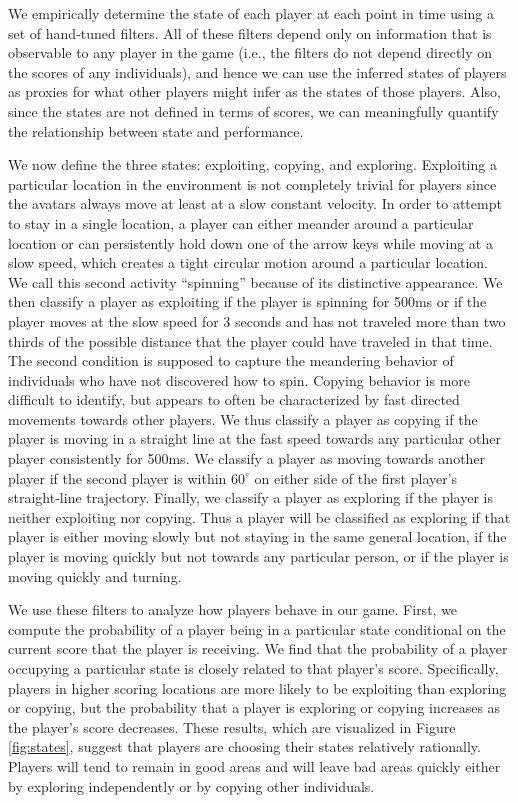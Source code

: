 \documentclass[12pt,letterpaper]{article}
\begin{document}
We empirically determine the state of each player at each point in
time using a set of hand-tuned filters.  All of these filters depend
only on information that is observable to any player in the game
(i.e., the filters do not depend directly on the scores of any
individuals), and hence we can use the inferred states of players as
proxies for what other players might infer as the states of those
players.  Also, since the states are not defined in terms of scores,
we can meaningfully quantify the relationship between state and
performance.

We now define the three states: exploiting, copying, and exploring.
Exploiting a particular location in the environment is not completely
trivial for players since the avatars always move at least at a slow
constant velocity.  In order to attempt to stay in a single location,
a player can either meander around a particular location or can
persistently hold down one of the arrow keys while moving at a slow
speed, which creates a tight circular motion around a particular
location.  We call this second activity ``spinning'' because of its
distinctive appearance.  We then classify a player as exploiting if
the player is spinning for 500ms or if the player moves at the slow
speed for 3 seconds and has not traveled more than two thirds of the
possible distance that the player could have traveled in that time.
The second condition is supposed to capture the meandering behavior of
individuals who have not discovered how to spin.  Copying behavior is
more difficult to identify, but appears to often be characterized by
fast directed movements towards other players.  We thus classify a
player as copying if the player is moving in a straight line at the
fast speed towards any particular other player consistently for 500ms.
We classify a player as moving towards another player if the second
player is within $60^\circ$ on either side of the first player's
straight-line trajectory.  Finally, we classify a player as exploring
if the player is neither exploiting nor copying.  Thus a player will
be classified as exploring if that player is either moving slowly but
not staying in the same general location, if the player is moving
quickly but not towards any particular person, or if the player is
moving quickly and turning.

We use these filters to analyze how players behave in our game.
First, we compute the probability of a player being in a particular
state conditional on the current score that the player is receiving.
We find that the probability of a player occupying a particular state
is closely related to that player's score.  Specifically, players in
higher scoring locations are more likely to be exploiting than
exploring or copying, but the probability that a player is exploring
or copying increases as the player's score decreases.  These results,
which are visualized in Figure \ref{fig:states}, suggest that players
are choosing their states relatively rationally.  Players will tend to
remain in good areas and will leave bad areas quickly either by
exploring independently or by copying other individuals.
\end{document}
